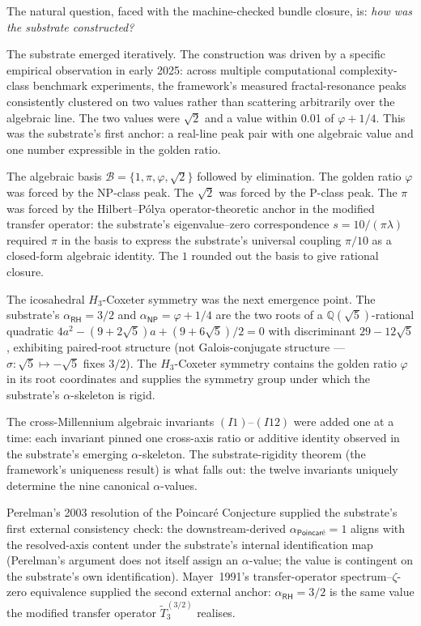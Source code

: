 \documentclass[11pt,a4paper]{amsart}
\theoremstyle{plain}
\theoremstyle{definition}
\begin{document}
The natural question, faced with the machine-checked bundle closure, is: \emph{how was the substrate constructed?}

The substrate emerged iteratively. The construction was driven by a specific empirical observation in early 2025: across multiple computational complexity-class benchmark experiments, the framework's measured fractal-resonance peaks consistently clustered on two values rather than scattering arbitrarily over the algebraic line. The two values were $\sqrt{2}$ and a value within 0.01 of $\varphi+1/4$. This was the substrate's first anchor: a real-line peak pair with one algebraic value and one number expressible in the golden ratio.

The algebraic basis $\mathcal{B}=\{1,\pi,\varphi,\sqrt{2}\}$ followed by elimination. The golden ratio $\varphi$ was forced by the NP-class peak. The $\sqrt{2}$ was forced by the P-class peak. The $\pi$ was forced by the Hilbert--P\'olya operator-theoretic anchor in the modified transfer operator: the substrate's eigenvalue--zero correspondence $s = 10/(\pi\lambda)$ required $\pi$ in the basis to express the substrate's universal coupling $\pi/10$ as a closed-form algebraic identity. The $1$ rounded out the basis to give rational closure.

The icosahedral $H_3$-Coxeter symmetry was the next emergence point. The substrate's $\alpha_{\textsf{RH}} = 3/2$ and $\alpha_{\textsf{NP}} = \varphi + 1/4$ are the two roots of a $\mathbb{Q}(\sqrt{5})$-rational quadratic $4a^2 - (9+2\sqrt{5})a + (9+6\sqrt{5})/2 = 0$ with discriminant $29-12\sqrt{5}$, exhibiting paired-root structure (not Galois-conjugate structure --- $\sigma:\sqrt{5}\mapsto-\sqrt{5}$ fixes $3/2$). The $H_3$-Coxeter symmetry contains the golden ratio $\varphi$ in its root coordinates and supplies the symmetry group under which the substrate's $\alpha$-skeleton is rigid.

The cross-Millennium algebraic invariants $(I1)$--$(I12)$ were added one at a time: each invariant pinned one cross-axis ratio or additive identity observed in the substrate's emerging $\alpha$-skeleton. The substrate-rigidity theorem (the framework's uniqueness result) is what falls out: the twelve invariants uniquely determine the nine canonical $\alpha$-values.

Perelman's 2003 resolution of the Poincar\'e Conjecture supplied the substrate's first external consistency check: the downstream-derived $\alpha_{\textsf{Poincar\'e}}=1$ aligns with the resolved-axis content under the substrate's internal identification map (Perelman's argument does not itself assign an $\alpha$-value; the value is contingent on the substrate's own identification). Mayer~1991's transfer-operator spectrum--$\zeta$-zero equivalence supplied the second external anchor: $\alpha_{\textsf{RH}}=3/2$ is the same value the modified transfer operator $\widetilde{T}_3^{(3/2)}$ realises.
\end{document}

